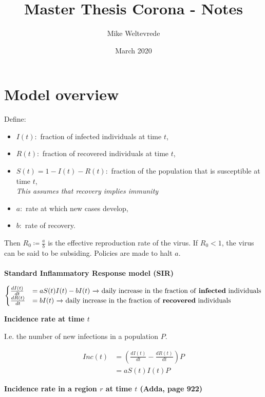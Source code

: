 \documentclass{article}
\title{Master Thesis Corona - Notes}
\author{Mike Weltevrede}
\date{March 2020}
\begin{document}
\maketitle

\tableofcontents

\section{Model overview}

Define:
\begin{itemize}
    \item $I(t):$ fraction of infected individuals at time $t$,
    \item $R(t):$ fraction of recovered individuals at time $t$,
    \item $S(t) = 1-I(t)-R(t):$ fraction of the population that is susceptible at time $t$,\\
            \textbullet \quad \textit{This assumes that recovery implies immunity}
    \item $a:$ rate at which new cases develop,
    \item $b:$ rate of recovery.
\end{itemize}

Then $R_0 \coloneqq \frac{a}{b}$ is the effective reproduction rate of the virus. If $R_0 < 1$, the virus can be said to be subsiding. Policies are made to halt $a$.
\\ \\
\textbf{Standard Inflammatory Response model (SIR)}

\[
\begin{cases}
    \frac{dI(t)}{dt} &= aS(t)I(t) - bI(t) \text{ $\xrightarrow{}$ daily increase in the fraction of \textbf{infected} individuals} \\
    \frac{dR(t)}{dt} &= bI(t) \text{ $\xrightarrow{}$ daily increase in the fraction of \textbf{recovered} individuals}
\end{cases}
\]

\newpage

\textbf{Incidence rate at time $t$}

I.e. the number of new infections in a population $P$.

\begin{align*}
    Inc(t)  &= \left( \frac{dI(t)}{dt} - \frac{dR(t)}{dt} \right)P\\
            &= aS(t)I(t)P
\end{align*}

\textbf{Incidence rate in a region $r$ at time $t$ (Adda, page 922)}
\end{document}
